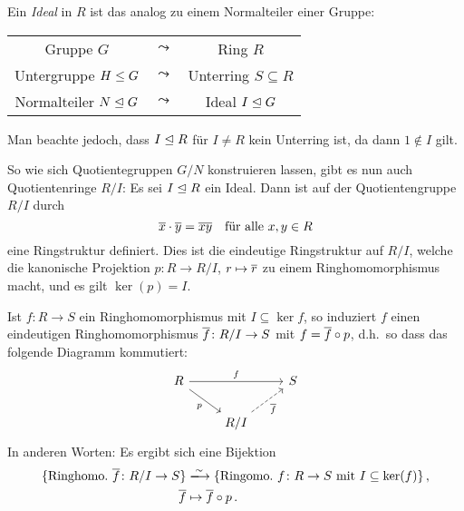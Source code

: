 \noindent
\begin{minipage}[t]{\textwidth}
Ein \emph{Ideal} in $R$ ist das analog zu einem Normalteiler einer Gruppe:
\begin{center}
  \renewcommand{\arraystretch}{1.3}
  \begin{tabular}{ccc}
      Gruppe $G$
    & $\leadsto$
    & Ring $R$
    \\
      Untergruppe $H \mathrel{\leq} G$
    & $\leadsto$
    & Unterring $S \subseteq R$
    \\
      Normalteiler $N \mathrel{\trianglelefteq} G$
    & $\leadsto$
    & Ideal $I \mathrel{\trianglelefteq} G$
  \end{tabular}
\end{center}
Man beachte jedoch, dass $I \mathrel{\trianglelefteq} R$ für $I \neq R$ kein Unterring ist, da dann $1 \notin I$ gilt.
\end{minipage}

So wie sich Quotientegruppen $G/N$ konstruieren lassen, gibt es nun auch Quotientenringe $R/I$:
Es sei $I \mathrel{\trianglelefteq} R$ ein Ideal.
Dann ist auf der Quotientengruppe $R/I$ durch
\[
    \overline{x} \cdot \overline{y}
  = \overline{xy}
  \quad
  \text{für alle $x, y \in R$}
\]
eine Ringstruktur definiert.
Dies ist die eindeutige Ringstruktur auf $R/I$, welche die kanonische Projektion $p \colon R \to R/I$, $r \mapsto \overline{r}$ zu einem Ringhomomorphismus macht, und es gilt $\ker(p) = I$.

\begin{theorem}
  Ist $f \colon R \to S$ ein Ringhomomorphismus mit $I \subseteq \ker f$, so induziert $f$ einen eindeutigen Ringhomomorphismus $\overline{f} \colon R/I \to S$ mit $f = \overline{f} \circ p$, d.h.\ so dass das folgende Diagramm kommutiert:
  \[
    \begin{tikzcd}
        R
        \arrow{rr}[above]{f}
        \arrow{dr}[below left]{p}
      & {}
      & S
      \\
        {}
      & R/I
        \arrow[dashed]{ru}[below right]{\induced{f}}
      & {}
    \end{tikzcd}
  \]
  In anderen Worten:
  Es ergibt sich eine Bijektion
  \begin{align*}
                            \{ \text{Ringhomo.\ $\induced{f} \colon R/I \to S$} \}
    &\xlongrightarrow{\sim} \{ \text{Ringomo.\ $f \colon R \to S$ mit $I \subseteq \ker(f)$} \} \,,  \\
                            \induced{f}
    &\mapsto                \induced{f} \circ p \,.
  \end{align*}
\end{theorem}

